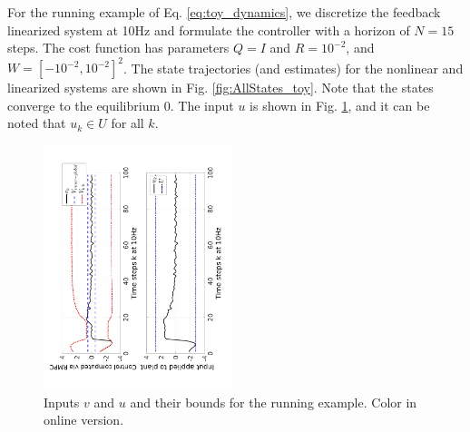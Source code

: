 For the running example of Eq. \ref{eq:toy_dynamics}, we discretize the feedback linearized system at 10Hz and formulate the controller with a horizon of $N=15$ steps. 
The cost function has parameters $Q=I$ and $R=10^{-2}$, and $W=[-10^{-2}, 10^{-2}]^2$.
The state trajectories (and estimates) for the nonlinear and linearized systems are shown in Fig. \ref{fig:AllStates_toy}.
Note that the states converge to the equilibrium 0. The input $u$ is shown in Fig. \ref{fig:input toy}, and it can be noted that $u_k \in U$ for all $k$.

\begin{figure}
	\centering	
	\includegraphics[angle=270,width=0.49\textwidth]{figs/u_and_v_toy.pdf}
	\caption{Inputs $v$ and $u$ and their bounds for the running example. Color in online version.}
	\label{fig:input toy}
\end{figure}


